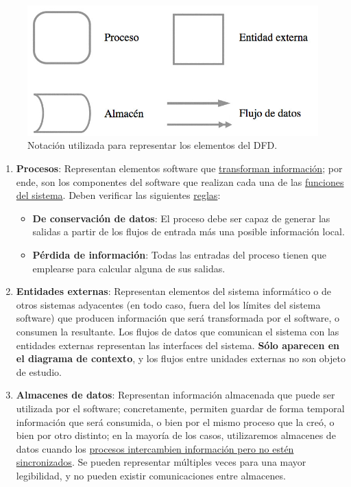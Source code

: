 \begin{figure}[H]
    \centering
    \includegraphics[width=0.5\linewidth]{Resources/Tema5/elementosDFD.jpg}
    \caption{Notación utilizada para representar los elementos del DFD.}
    \label{fig:elementosDFD}
\end{figure}
\begin{enumerate}
    \item \textbf{Procesos}: Representan elementos software que \uline{transforman información}; por ende, son los componentes del software que realizan cada una de las \uline{funciones del sistema}. Deben verificar las siguientes \uline{reglas}:
    \begin{itemize}
        \item \textbf{De conservación de datos}: El proceso debe ser capaz de generar las salidas a partir de los flujos de entrada más una posible información local.
        \item \textbf{Pérdida de información}: Todas las entradas del proceso tienen que emplearse para calcular alguna de sus salidas.
    \end{itemize}

    \item \textbf{Entidades externas}: Representan elementos del sistema informático o de otros sistemas adyacentes (en todo caso, fuera del los límites del sistema software) que producen información que será transformada por el software, o consumen la resultante. Los flujos de datos que comunican el sistema con las entidades externas representan las interfaces del sistema. \textbf{Sólo aparecen en el diagrama de contexto}, y los flujos entre unidades externas no son objeto de estudio.

    \item \textbf{Almacenes de datos}: Representan información almacenada que puede ser utilizada por el software; concretamente, permiten guardar de forma temporal información que será consumida, o bien por el mismo proceso que la creó, o bien por otro distinto; en la mayoría de los casos, utilizaremos almacenes de datos cuando los \uline{procesos intercambien información pero no estén sincronizados}. Se pueden representar múltiples veces para una mayor legibilidad, y no pueden existir comunicaciones entre almacenes.


\end{enumerate}
